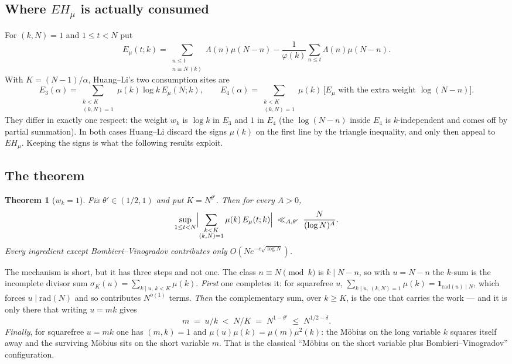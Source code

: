 \documentclass[11pt,a4paper]{article}
\theoremstyle{plain}
\newtheorem{theorem}{Theorem}
\theoremstyle{definition}
\begin{document}
\subsection{Where $EH_\mu$ is actually consumed}

For $(k,N)=1$ and $1\le t<N$ put
\[
  E_\mu(t;k) = \sum_{\substack{n\le t\\ n\equiv N\,(k)}}
    \Lambda(n)\mu(N-n) - \frac{1}{\varphi(k)}\sum_{n\le t}
    \Lambda(n)\mu(N-n).
\]
With $K = (N-1)/\alpha$, Huang--Li's two consumption sites are
\[
  E_3(\alpha)=\!\!\sum_{\substack{k<K\\(k,N)=1}}\!\!\mu(k)\log k\,
  E_\mu(N;k),
  \qquad
  E_4(\alpha)=\!\!\sum_{\substack{k<K\\(k,N)=1}}\!\!\mu(k)\,
  \bigl[\text{$E_\mu$ with the extra weight }\log(N-n)\bigr].
\]
They differ in exactly one respect: the weight $w_k$ is $\log k$ in
$E_3$ and $1$ in $E_4$ (the $\log(N-n)$ inside $E_4$ is
$k$-independent and comes off by partial summation). In both cases
Huang--Li discard the signs $\mu(k)$ on the first line by the triangle
inequality, and only then appeal to $EH_\mu$. Keeping the signs is
what the following results exploit.

\subsection{The theorem}

\begin{theorem}[$w_k = 1$]\label{thm:A}
Fix $\theta' \in (1/2,1)$ and put $K = N^{\theta'}$. Then for every
$A>0$,
\[
  \sup_{1\le t<N}\Bigl|
   \sum_{\substack{k<K\\(k,N)=1}}\mu(k)\,E_\mu(t;k)\Bigr|
  \;\ll_{A,\theta'}\; \frac{N}{(\log N)^A}.
\]
Every ingredient except Bombieri--Vinogradov contributes only
$O(Ne^{-c\sqrt{\log N}})$.
\end{theorem}

The mechanism is short, but it has three steps and not one. The class
$n \equiv N \pmod k$ is $k \mid N-n$, so with $u = N-n$ the $k$-sum is
the incomplete divisor sum $\sigma_K(u) = \sum_{k\mid u,\,k<K}\mu(k)$.
\emph{First} one completes it: for squarefree $u$,
$\sum_{k\mid u,\,(k,N)=1}\mu(k) = \mathbf 1_{\mathrm{rad}(u)\mid N}$,
which forces $u\mid \mathrm{rad}(N)$ and so contributes $N^{o(1)}$
terms. \emph{Then} the complementary sum, over $k\ge K$, is the one
that carries the work --- and it is only there that writing $u = mk$
gives
\[
  m \;=\; u/k \;<\; N/K \;=\; N^{1-\theta'} \;\le\; N^{1/2-\delta}.
\]
\emph{Finally}, for squarefree $u=mk$ one has $(m,k)=1$ and
$\mu(u)\mu(k) = \mu(m)\mu^2(k)$: the M\"obius on the long variable $k$
squares itself away and the surviving M\"obius sits on the short
variable $m$. That is the classical ``M\"obius on the short variable
plus Bombieri--Vinogradov'' configuration.
\end{document}
